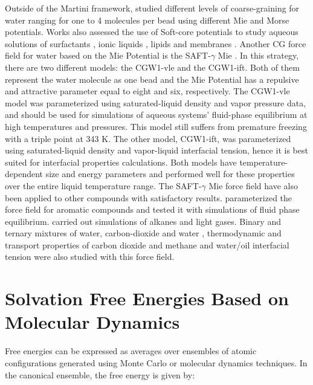 Outside of the Martini framework,  studied different levels of coarse-graining for water ranging for one to 4 molecules per bead using different Mie and Morse potentials. Works also assessed the use of Soft-core potentials to study aqueous solutions of surfactants \cite{shinoda2007}, ionic liquids \cite{bhargava2009}, lipids \cite{shinoda20102} and membranes \cite{pantano2009}. Another CG force field for water based on the Mie Potential is the SAFT-$\gamma$ Mie \cite{lobanova2015}. In this strategy, there are two different models: the CGW1-vle and the CGW1-ift. Both of them represent the water molecule as one bead and  the Mie Potential has a repulsive and attractive parameter equal to eight and six, respectively. The CGW1-vle model was parameterized using saturated-liquid density and vapor pressure data, and should be used for simulations of aqueous systems' fluid-phase equilibrium at high temperatures and pressures. This model still suffers from premature freezing with a triple point at 343 K. The other model, CGW1-ift, was parameterized using saturated-liquid density and vapor-liquid interfacial tension, hence it is best suited for interfacial properties calculations. Both models have temperature-dependent size and energy parameters and performed well for these properties over the entire liquid temperature range. The SAFT-$\gamma$ Mie force field have also been applied to other compounds with satisfactory results.  parameterized the force field for aromatic compounds and tested it with simulations of fluid phase equilibrium.  carried out simulations of alkanes and light gases. Binary and ternary mixtures of water, carbon-dioxide and water \cite{lobanova2016}, thermodynamic and transport properties of carbon dioxide and methane \cite{cassiano1,cassiano2} and water/oil interfacial tension \cite{herdes2017} were also studied with this force field.  





\section{Solvation Free Energies Based on Molecular Dynamics}

Free energies can be expressed as averages over ensembles of atomic configurations generated using Monte Carlo or molecular dynamics techniques. In the canonical ensemble, the free energy is given by:  

